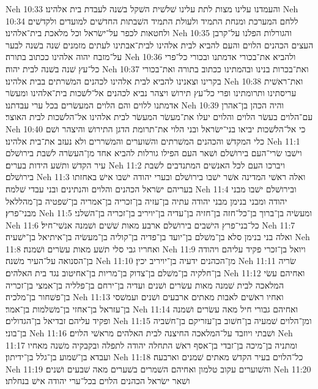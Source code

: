 Neh 10:33  והעמדנו עלינו מצות לתת עלינו שׁלשׁית השׁקל בשׁנה לעבדת בית אלהינו׃
Neh 10:34  ללחם המערכת ומנחת התמיד ולעולת התמיד השׁבתות החדשׁים למועדים ולקדשׁים ולחטאות לכפר על־ישׂראל וכל מלאכת בית־אלהינו׃
Neh 10:35  והגורלות הפלנו על־קרבן העצים הכהנים הלוים והעם להביא לבית אלהינו לבית־אבתינו לעתים מזמנים שׁנה בשׁנה לבער על־מזבח יהוה אלהינו ככתוב בתורה׃
Neh 10:36  ולהביא את־בכורי אדמתנו ובכורי כל־פרי כל־עץ שׁנה בשׁנה לבית יהוה׃
Neh 10:37  ואת־בכרות בנינו ובהמתינו ככתוב בתורה ואת־בכורי בקרינו וצאנינו להביא לבית אלהינו לכהנים המשׁרתים בבית אלהינו׃
Neh 10:38  ואת־ראשׁית עריסתינו ותרומתינו ופרי כל־עץ תירושׁ ויצהר נביא לכהנים אל־לשׁכות בית־אלהינו ומעשׂר אדמתנו ללוים והם הלוים המעשׂרים בכל ערי עבדתנו׃
Neh 10:39  והיה הכהן בן־אהרן עם־הלוים בעשׂר הלוים והלוים יעלו את־מעשׂר המעשׂר לבית אלהינו אל־הלשׁכות לבית האוצר׃
Neh 10:40  כי אל־הלשׁכות יביאו בני־ישׂראל ובני הלוי את־תרומת הדגן התירושׁ והיצהר ושׁם כלי המקדשׁ והכהנים המשׁרתים והשׁוערים והמשׁררים ולא נעזב את־בית אלהינו׃
Neh 11:1  וישׁבו שׂרי־העם בירושׁלם ושׁאר העם הפילו גורלות להביא אחד מן־העשׂרה לשׁבת בירושׁלם עיר הקדשׁ ותשׁע הידות בערים׃
Neh 11:2  ויברכו העם לכל האנשׁים המתנדבים לשׁבת בירושׁלם׃
Neh 11:3  ואלה ראשׁי המדינה אשׁר ישׁבו בירושׁלם ובערי יהודה ישׁבו אישׁ באחזתו בעריהם ישׂראל הכהנים והלוים והנתינים ובני עבדי שׁלמה׃
Neh 11:4  ובירושׁלם ישׁבו מבני יהודה ומבני בנימן מבני יהודה עתיה בן־עזיה בן־זכריה בן־אמריה בן־שׁפטיה בן־מהללאל מבני־פרץ׃
Neh 11:5  ומעשׂיה בן־ברוך בן־כל־חזה בן־חזיה בן־עדיה בן־יויריב בן־זכריה בן־השׁלני׃
Neh 11:6  כל־בני־פרץ הישׁבים בירושׁלם ארבע מאות שׁשׁים ושׁמנה אנשׁי־חיל׃
Neh 11:7  ואלה בני בנימן סלא בן־משׁלם בן־יועד בן־פדיה בן־קוליה בן־מעשׂיה בן־איתיאל בן־ישׁעיה׃
Neh 11:8  ואחריו גבי סלי תשׁע מאות עשׂרים ושׁמנה׃
Neh 11:9  ויואל בן־זכרי פקיד עליהם ויהודה בן־הסנואה על־העיר משׁנה׃
Neh 11:10  מן־הכהנים ידעיה בן־יויריב יכין׃
Neh 11:11  שׂריה בן־חלקיה בן־משׁלם בן־צדוק בן־מריות בן־אחיטוב נגד בית האלהים׃
Neh 11:12  ואחיהם עשׂי המלאכה לבית שׁמנה מאות עשׂרים ושׁנים ועדיה בן־ירחם בן־פלליה בן־אמצי בן־זכריה בן־פשׁחור בן־מלכיה׃
Neh 11:13  ואחיו ראשׁים לאבות מאתים ארבעים ושׁנים ועמשׁסי בן־עזראל בן־אחזי בן־משׁלמות בן־אמר׃
Neh 11:14  ואחיהם גבורי חיל מאה עשׂרים ושׁמנה ופקיד עליהם זבדיאל בן־הגדולים׃
Neh 11:15  ומן־הלוים שׁמעיה בן־חשׁוב בן־עזריקם בן־חשׁביה בן־בוני׃
Neh 11:16  ושׁבתי ויוזבד על־המלאכה החיצנה לבית האלהים מראשׁי הלוים׃
Neh 11:17  ומתניה בן־מיכה בן־זבדי בן־אסף ראשׁ התחלה יהודה לתפלה ובקבקיה משׁנה מאחיו ועבדא בן־שׁמוע בן־גלל בן־ידיתון׃
Neh 11:18  כל־הלוים בעיר הקדשׁ מאתים שׁמנים וארבעה׃
Neh 11:19  והשׁוערים עקוב טלמון ואחיהם השׁמרים בשׁערים מאה שׁבעים ושׁנים׃
Neh 11:20  ושׁאר ישׂראל הכהנים הלוים בכל־ערי יהודה אישׁ בנחלתו׃
